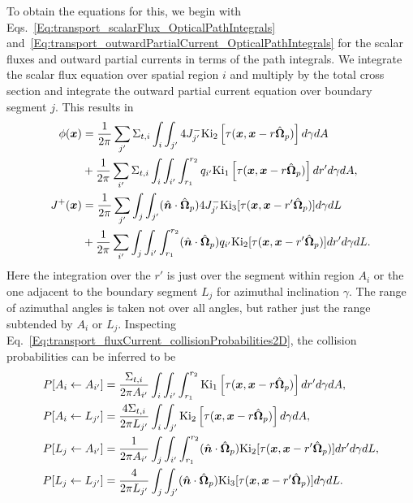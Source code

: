 To obtain the equations for this, we begin with Eqs.~\eqref{Eq:transport_scalarFlux_OpticalPathIntegrals} and~\eqref{Eq:transport_outwardPartialCurrent_OpticalPathIntegrals} for the scalar fluxes and outward partial currents in terms of the path integrals. We integrate the scalar flux equation over spatial region $i$ and multiply by the total cross section and integrate the outward partial current equation over boundary segment $j$. This results in
\begin{subequations} \label{Eq:transport_collisionProbabilityMethod2D_collisionRate_outwardCurrent}
\begin{align}
   \phi(\bm{x}) &= \frac{1}{2\pi} \sum_{j'} \Sigma_{t,i} \int_i \int_{j'} 4 J^-_{j'} \textrm{Ki}_2 \left[ \tau(\bm{x},\bm{x} - r \hat{\mathbf{\Omega}}_p) \right] d\gamma dA \nonumber \\*
  &+ \frac{1}{2\pi} \sum_{i'} \Sigma_{t,i} \int_i \int_{i'} \int_{r_1}^{r_2} q_{i'} \textrm{Ki}_1 \left[ \tau(\bm{x},\bm{x} - r \hat{\mathbf{\Omega}}_p) \right] dr' d\gamma dA, \\
  J^+(\bm{x}) &= \frac{1}{2\pi} \sum_{j'} \int_j \int_{j'} ( \hat{\bm{n}} \cdot \hat{\mathbf{\Omega}}_p )  4J^-_{j'} \textrm{Ki}_3 [ \tau(\bm{x},\bm{x} - r' \hat{\mathbf{\Omega}}_p) ] d\gamma dL \nonumber \\*
  &+ \frac{1}{2\pi} \sum_{i'} \int_j \int_{i'} \int_{r_1}^{r_2}  ( \hat{\bm{n}} \cdot \hat{\mathbf{\Omega}}_p ) q_{i'} \textrm{Ki}_2 [ \tau(\bm{x},\bm{x} - r' \hat{\mathbf{\Omega}}_p) ] dr' d\gamma dL.  
\end{align}
\end{subequations}
Here the integration over the $r'$ is just over the segment within region $A_i$ or the one adjacent to the boundary segment $L_j$ for azimuthal inclination $\gamma$. The range of azimuthal angles is taken not over all angles, but rather just the range subtended by $A_i$ or $L_j$. Inspecting Eq.~\eqref{Eq:transport_fluxCurrent_collisionProbabilities2D}, the collision probabilities can be inferred to be
\begin{subequations}
\begin{align}
   P[ A_i \leftarrow A_{i'} ] &= \frac{ \Sigma_{t,i} }{ 2\pi A_{i'} } \int_i \int_{i'} \int_{r_1}^{r_2} \textrm{Ki}_1 \left[ \tau(\bm{x},\bm{x} - r \hat{\mathbf{\Omega}}_p) \right] dr' d\gamma dA , \\
   P[ A_i \leftarrow L_{j'} ] &= \frac{ 4 \Sigma_{t,i} }{ 2\pi L_{j'} } \int_i \int_{j'} \textrm{Ki}_2 \left[ \tau(\bm{x},\bm{x} - r \hat{\mathbf{\Omega}}_p) \right] d\gamma dA , \\
   P[ L_j \leftarrow A_{i'} ] &= \frac{ 1 }{ 2\pi A_{i'} } \int_j \int_{i'} \int_{r_1}^{r_2}  ( \hat{\bm{n}} \cdot \hat{\mathbf{\Omega}}_p ) \textrm{Ki}_2 [ \tau(\bm{x},\bm{x} - r' \hat{\mathbf{\Omega}}_p) ] dr' d\gamma dL, \\
   P[ L_j \leftarrow L_{j'} ] &= \frac{ 4 }{ 2\pi L_{j'} } \int_j \int_{j'} ( \hat{\bm{n}} \cdot \hat{\mathbf{\Omega}}_p ) \textrm{Ki}_3 [ \tau(\bm{x},\bm{x} - r' \hat{\mathbf{\Omega}}_p) ] d\gamma dL .
\end{align}
\end{subequations}

